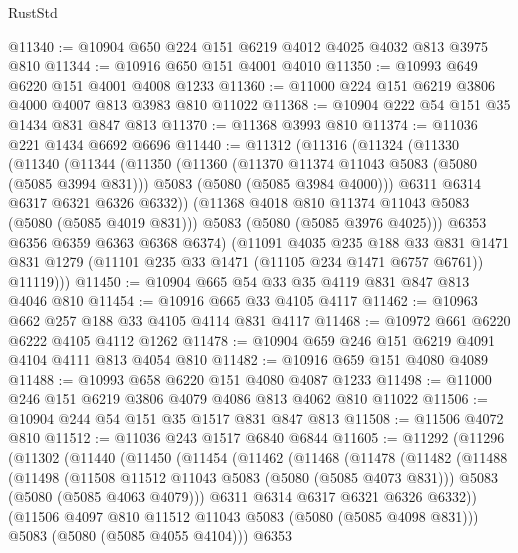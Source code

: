 \begin{lexlean}{RustStd}
\begin{coremodule}
{\begin{coremodule}
{{{{{@11340 := @10904 @650 @224 @151 @6219 @4012 @4025 @4032 @813 @3975 @810
@11344 := @10916 @650 @151 @4001 @4010
@11350 := @10993 @649 @6220 @151 @4001 @4008 @1233
@11360 := @11000 @224 @151 @6219 @3806 @4000 @4007 @813 @3983 @810 @11022
@11368 := @10904 @222 @54 @151 @35 @1434 @831 @847 @813
@11370 := @11368 @3993 @810
@11374 := @11036 @221 @1434 @6692 @6696
@11440 := @11312
    (@11316
      (@11324
        (@11330
          (@11340
            (@11344
              (@11350
                (@11360
                  (@11370 @11374 @11043 @5083 (@5080 (@5085 @3994 @831)))
                  @5083
                  (@5080 (@5085 @3984 @4000)))
                @6311
                @6314
                @6317
                @6321
                @6326
                @6332))
            (@11368 @4018 @810 @11374 @11043 @5083 (@5080 (@5085 @4019 @831)))
            @5083
            (@5080 (@5085 @3976 @4025)))
          @6353
          @6356
          @6359
          @6363
          @6368
          @6374)
        (@11091
          @4035
          @235
          @188
          @33
          @831
          @1471
          @831
          @1279
          (@11101 @235 @33 @1471 (@11105 @234 @1471 @6757 @6761))
          @11119)))
@11450 := @10904 @665 @54 @33 @35 @4119 @831 @847 @813 @4046 @810
@11454 := @10916 @665 @33 @4105 @4117
@11462 := @10963 @662 @257 @188 @33 @4105 @4114 @831 @4117
@11468 := @10972 @661 @6220 @6222 @4105 @4112 @1262
@11478 := @10904 @659 @246 @151 @6219 @4091 @4104 @4111 @813 @4054 @810
@11482 := @10916 @659 @151 @4080 @4089
@11488 := @10993 @658 @6220 @151 @4080 @4087 @1233
@11498 := @11000 @246 @151 @6219 @3806 @4079 @4086 @813 @4062 @810 @11022
@11506 := @10904 @244 @54 @151 @35 @1517 @831 @847 @813
@11508 := @11506 @4072 @810
@11512 := @11036 @243 @1517 @6840 @6844
@11605 := @11292
    (@11296
      (@11302
        (@11440
          (@11450
            (@11454
              (@11462
                (@11468
                  (@11478
                    (@11482
                      (@11488
                        (@11498
                          (@11508 @11512 @11043 @5083 (@5080 (@5085 @4073 @831)))
                          @5083
                          (@5080 (@5085 @4063 @4079)))
                        @6311
                        @6314
                        @6317
                        @6321
                        @6326
                        @6332))
                    (@11506 @4097 @810 @11512 @11043 @5083 (@5080 (@5085 @4098 @831)))
                    @5083
                    (@5080 (@5085 @4055 @4104)))
                  @6353
}}}}}
\end{coremodule}}
\end{coremodule}
\end{lexlean}
